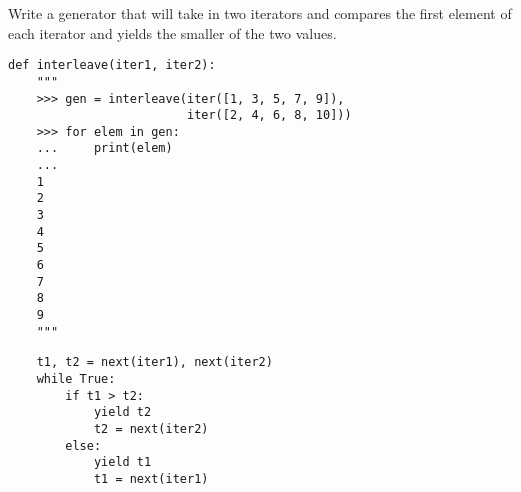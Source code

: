 \begin{blocksection}
\question Write a generator that will take in two iterators and compares the
first element of each iterator and yields the smaller of the two values.

\begin{lstlisting}
def interleave(iter1, iter2):
    """
    >>> gen = interleave(iter([1, 3, 5, 7, 9]),
                         iter([2, 4, 6, 8, 10]))
    >>> for elem in gen:
    ...     print(elem)
    ...
    1
    2
    3
    4
    5
    6
    7
    8
    9
    """
\end{lstlisting}

\begin{solution}[1in]
\begin{lstlisting}
    t1, t2 = next(iter1), next(iter2)
    while True:
        if t1 > t2:
            yield t2
            t2 = next(iter2)
        else:
            yield t1
            t1 = next(iter1)
\end{lstlisting}
\end{solution}
\end{blocksection}
